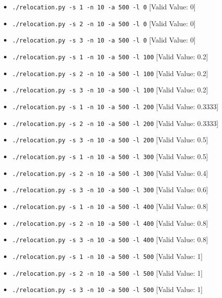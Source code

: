 \documentclass[12pt]{article}
\begin{document}
\begin{enumerate}[1.]
    \begin{itemize}
        \item \texttt{./relocation.py -s 1 -n 10 -a 500 -l 0} [Valid Value: 0]
        \item \texttt{./relocation.py -s 2 -n 10 -a 500 -l 0} [Valid Value: 0]
        \item \texttt{./relocation.py -s 3 -n 10 -a 500 -l 0} [Valid Value: 0]
        \item \texttt{./relocation.py -s 1 -n 10 -a 500 -l 100} [Valid Value: 0.2]
        \item \texttt{./relocation.py -s 2 -n 10 -a 500 -l 100} [Valid Value: 0.2]
        \item \texttt{./relocation.py -s 3 -n 10 -a 500 -l 100} [Valid Value: 0.2]
        \item \texttt{./relocation.py -s 1 -n 10 -a 500 -l 200} [Valid Value: 0.3333]
        \item \texttt{./relocation.py -s 2 -n 10 -a 500 -l 200} [Valid Value: 0.3333]
        \item \texttt{./relocation.py -s 3 -n 10 -a 500 -l 200} [Valid Value: 0.5]
        \item \texttt{./relocation.py -s 1 -n 10 -a 500 -l 300} [Valid Value: 0.5]
        \item \texttt{./relocation.py -s 2 -n 10 -a 500 -l 300} [Valid Value: 0.4]
        \item \texttt{./relocation.py -s 3 -n 10 -a 500 -l 300} [Valid Value: 0.6]
        \item \texttt{./relocation.py -s 1 -n 10 -a 500 -l 400} [Valid Value: 0.8]
        \item \texttt{./relocation.py -s 2 -n 10 -a 500 -l 400} [Valid Value: 0.8]
        \item \texttt{./relocation.py -s 3 -n 10 -a 500 -l 400} [Valid Value: 0.8]
        \item \texttt{./relocation.py -s 1 -n 10 -a 500 -l 500} [Valid Value: 1]
        \item \texttt{./relocation.py -s 2 -n 10 -a 500 -l 500} [Valid Value: 1]
        \item \texttt{./relocation.py -s 3 -n 10 -a 500 -l 500} [Valid Value: 1]
    \end{itemize}


\end{enumerate}
\end{document}
